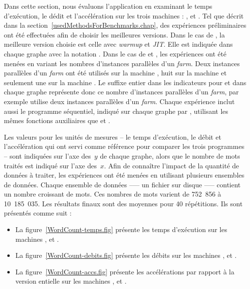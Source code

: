 Dans cette section, nous \'evaluons l'application  en examinant le temps d'ex\'ecution, le d\'edit et l'acc\'el\'eration sur les trois machines : ,  et . Tel que d\'ecrit dans la section~\ref{usedMethodsForBenchmarks.chap}, des exp\'eriences pr\'eliminaires ont \'et\'e effectu\'ees afin de choisir les meilleures versions. Dans le cas de , la meilleure version choisie est celle avec \emph{warmup} et \emph{JIT}. Elle est indiquée dans chaque graphe avec la notation . Dans le cas de  et , les exp\'eriences ont \'et\'e men\'ees en variant les nombres d'instances parall\`eles d'un \emph{farm}. Deux instances parall\`eles d'un \emph{farm} ont \'et\'e utilis\'es sur la machine , huit sur la machine  et seulement une sur la machine . Le suffixe entier dans les indicateurs pour  et  dans chaque graphe repr\'esente donc ce nombre d'instances parall\`eles d'un \emph{farm}, par exemple  utilise deux instances parall\`eles d'un \emph{farm}. Chaque exp\'erience inclut aussi le programme s\'equentiel, indiqué sur chaque graphe par , utilisant  les m\^emes fonctions auxiliaires que  et .

Les valeurs pour les unit\'es de mesures -- le temps d'ex\'ecution, le d\'ebit et l'acc\'el\'eration qui ont servi comme r\'ef\'erence pour comparer les trois programmes -- sont indiqu\'ees sur l'axe des~$y$ de chaque graphe, alors que le nombre de mots trait\'es est indiqu\'e sur l'axe des~$x$. Afin de conna\^itre l'impact de la quantit\'e de donn\'ees \`a traiter, les exp\'eriences ont \'et\'e men\'ees en utilisant plusieurs ensembles de donn\'ees. Chaque ensemble de donn\'ees --— un fichier sur disque --— contient un nombre croissant de mots. Ces nombres de mots varient de 752~856 \`a 10~185~035. Les r\'esultats finaux sont des moyennes pour 40 r\'ep\'etitions. Ils sont pr\'esent\'es comme suit : 



\begin{itemize}

\item La figure~\ref{WordCount-temps.fig} pr\'esente les temps
d'ex\'ecution sur les machines ,  et .

\item La figure~\ref{WordCount-debits.fig} pr\'esente les débits sur
les machines ,  et .

\item La figure~\ref{WordCount-accs.fig} pr\'esente les accélérations
par rapport à la version entielle
sur les machines ,  et .
\end{itemize}


